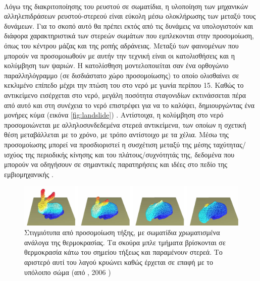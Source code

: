 \paragraph{} Λόγω της διακριτοποίησης του ρευστού σε σωματίδια, η υλοποίηση των μηχανικών
αλληλεπιδράσεων ρευστού-στερεού είναι εύκολη μέσω ολοκλήρωσης των μεταξύ τους
δυνάμεων. Για το σκοπό αυτό θα πρέπει εκτός από τις δυνάμεις να υπολογιστούν και διάφορα
χαρακτηριστικά των στερεών σωμάτων που εμπλεκονται στην προσομοίωση, όπως του κέντρου
μάζας και της ροπής αδράνειας. Μεταξύ των φαινομένων που μπορούν να προσομοιωθούν με αυτήν
την τεχνική είναι οι κατολισθήσεις και η κολύμβηση των ψαριών. Η κατολίσθηση
μοντελοποιείται σαν ένα ορθογώνιο παραλληλόγραμμο (σε δισδιάστατο χώρο προσομοίωσης) το
οποίο ολισθαίνει σε κεκλιμένο επίπεδο μέχρι την πτώση του στο νερό με γωνία περίπου
15\textdegree. Καθώς το αντικείμενο εισέρχεται στο νερό, μεγάλη ποσότητα σταγονιδίων
εκτινάσσεται πέρα από αυτό και στη συνέχεια το νερό επιστρέφει για να το καλύψει,
δημιουργώντας ένα μονήρες κύμα (εικόνα \ref{fig:landslide})
\cite{monaghan2003fluid}. Αντίστοιχα, η κολύμβηση στο νερό προσομοιώνεται με
αλληλοσυνδεδεμένα στερεά αντικείμενα, των οποίων η σχετική θέση μεταβάλλεται με το χρόνο,
με τρόπο αντίστοιχο με τα χέλια. Μέσω της προσομοίωσης μπορεί να προσδιοριστεί η συσχέτιση
μεταξύ της μέσης ταχύτητας/ισχύος της περιοδικής κίνησης και του πλάτους/συχνότητάς της,
δεδομένα που μπορούν να οδηγήσουν σε σημαντικές παρατηρήσεις και ιδέες στο πεδίο της
εμβιομηχανικής \cite{kajtar2010}.

\begin{figure}[]
  \centering
  \includegraphics[width=\textwidth]{figures/melting-bunny.pdf}
  \caption[Προσομοίωση τήξης με ] {Στιγμιότυπα από προσομοίωση τήξης, με
    σωματίδια χρωματισμένα ανάλογα της θερμοκρασίας. Τα σκούρα μπλε τμήματα βρίσκονται σε
    θερμοκρασία κάτω του σημείου τήξεως και παραμένουν στερεά. Το αριστερό αυτί του λαγού
    κρυώνει καθώς έρχεται σε επαφή με το υπόλοιπο σώμα (από , 2006
    \cite{paiva2006particle})}
  \label{fig:melting-bunny}
\end{figure}

